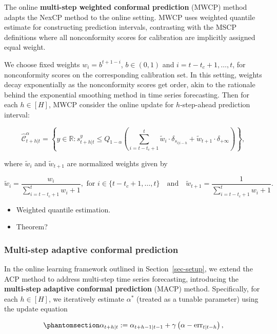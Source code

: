\documentclass[
  11pt,
  a4paper,
]{article}
\theoremstyle{plain}
\theoremstyle{plain}
\theoremstyle{remark}
\begin{document}
The online \textbf{multi-step weighted conformal prediction} (MWCP)
method adapts the NexCP method to the online setting. MWCP uses weighted
quantile estimate for constructing prediction intervals, contrasting
with the MSCP definitions where all nonconformity scores for calibration
are implicitly assigned equal weight.

We choose fixed weights \(w_i = b^{t+1-i}\), \(b \in (0, 1)\) and
\(i=t-t_c+1,\ldots,t\), for nonconformity scores on the corresponding
calibration set. In this setting, weights decay exponentially as the
nonconformity scores get order, akin to the rationale behind the
exponential smoothing method in time series forecasting. Then for each
\(h \in [H]\), MWCP consider the online update for \(h\)-step-ahead
prediction interval:

\[
\hat{\mathcal{C}}_{t+h|t}^{\alpha} = \left\{y\in\mathbb{R}: s_{t+h|t}^{y} \leq Q_{1-\alpha}\left(\sum_{i=t-t_c+1}^{t}\tilde{w}_i\cdot\delta_{s_{i|i-h}}+\tilde{w}_{t+1}\cdot\delta_{+\infty}\right)\right\},
\]

where \(\tilde{w}_i\) and \(\tilde{w}_{t+1}\) are normalized weights
given by

\[
\tilde{w}_i = \frac{w_i}{\sum_{i=t-t_c+1}^{t}w_i+1}, \text{ for } i \in \{t-t_c+1,\ldots,t\} \quad \text{and} \quad \tilde{w}_{t+1} =  \frac{1}{\sum_{i=t-t_c+1}^{t}w_i+1}.
\]

\begin{itemize}
\item
  Weighted quantile estimation.
\item
  Theorem?
\end{itemize}

\subsubsection{Multi-step adaptive conformal
prediction}\label{multi-step-adaptive-conformal-prediction}

In the online learning framework outlined in Section~\ref{sec-setup}, we
extend the ACP method to address multi-step time series forecasting,
introducing the \textbf{multi-step adaptive conformal prediction} (MACP)
method. Specifically, for each \(h \in [H]\), we iteratively estimate
\(\alpha^{*}\) (treated as a tunable parameter) using the update
equation

\begin{equation}\phantomsection\label{eq-macp}{
\alpha_{t+h|t} := \alpha_{t+h-1|t-1} + \gamma\left(\alpha - \mathrm{err}_{t|t-h}\right),
}\end{equation}
\end{document}
